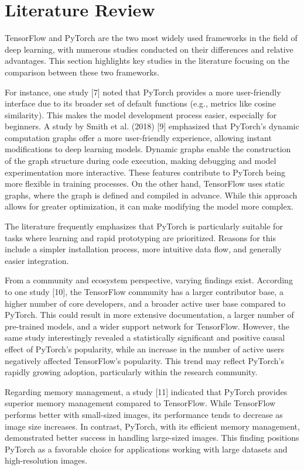 \documentclass[conference]{IEEEtran}
\begin{document}
\section{Literature Review}

TensorFlow and PyTorch are the two most widely used frameworks in the field of deep learning, with numerous studies conducted on their differences and relative advantages. This section highlights key studies in the literature focusing on the comparison between these two frameworks.

For instance, one study [7] noted that PyTorch provides a more user-friendly interface due to its broader set of default functions (e.g., metrics like cosine similarity). This makes the model development process easier, especially for beginners. A study by Smith et al. (2018) [9] emphasized that PyTorch's dynamic computation graphs offer a more user-friendly experience, allowing instant modifications to deep learning models. Dynamic graphs enable the construction of the graph structure during code execution, making debugging and model experimentation more interactive. These features contribute to PyTorch being more flexible in training processes. On the other hand, TensorFlow uses static graphs, where the graph is defined and compiled in advance. While this approach allows for greater optimization, it can make modifying the model more complex.

The literature frequently emphasizes that PyTorch is particularly suitable for tasks where learning and rapid prototyping are prioritized. Reasons for this include a simpler installation process, more intuitive data flow, and generally easier integration.

From a community and ecosystem perspective, varying findings exist. According to one study [10], the TensorFlow community has a larger contributor base, a higher number of core developers, and a broader active user base compared to PyTorch. This could result in more extensive documentation, a larger number of pre-trained models, and a wider support network for TensorFlow. However, the same study interestingly revealed a statistically significant and positive causal effect of PyTorch's popularity, while an increase in the number of active users negatively affected TensorFlow's popularity. This trend may reflect PyTorch's rapidly growing adoption, particularly within the research community.

Regarding memory management, a study [11] indicated that PyTorch provides superior memory management compared to TensorFlow. While TensorFlow performs better with small-sized images, its performance tends to decrease as image size increases. In contrast, PyTorch, with its efficient memory management, demonstrated better success in handling large-sized images. This finding positions PyTorch as a favorable choice for applications working with large datasets and high-resolution images.
\end{document}
